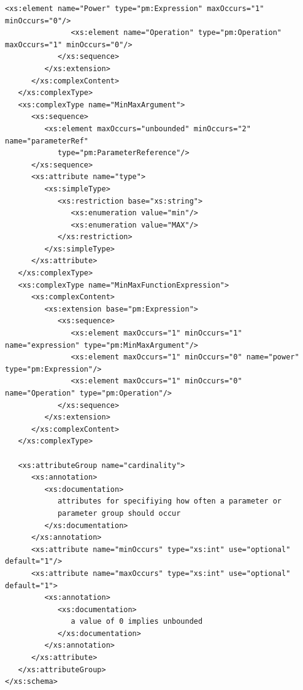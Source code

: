 \documentclass[a4paper,11pt] {ivoa}
\begin{document}
\begin{lstlisting}[style=listXML]
               <xs:element name="Power" type="pm:Expression" maxOccurs="1" minOccurs="0"/>
               <xs:element name="Operation" type="pm:Operation" maxOccurs="1" minOccurs="0"/>
            </xs:sequence>
         </xs:extension>
      </xs:complexContent>
   </xs:complexType>
   <xs:complexType name="MinMaxArgument">
      <xs:sequence>
         <xs:element maxOccurs="unbounded" minOccurs="2" name="parameterRef"
            type="pm:ParameterReference"/>
      </xs:sequence>
      <xs:attribute name="type">
         <xs:simpleType>
            <xs:restriction base="xs:string">
               <xs:enumeration value="min"/>
               <xs:enumeration value="MAX"/>
            </xs:restriction>
         </xs:simpleType>
      </xs:attribute>
   </xs:complexType>
   <xs:complexType name="MinMaxFunctionExpression">
      <xs:complexContent>
         <xs:extension base="pm:Expression">
            <xs:sequence>
               <xs:element maxOccurs="1" minOccurs="1" name="expression" type="pm:MinMaxArgument"/>
               <xs:element maxOccurs="1" minOccurs="0" name="power" type="pm:Expression"/>
               <xs:element maxOccurs="1" minOccurs="0" name="Operation" type="pm:Operation"/>
            </xs:sequence>
         </xs:extension>
      </xs:complexContent>
   </xs:complexType>

   <xs:attributeGroup name="cardinality">
      <xs:annotation>
         <xs:documentation>
            attributes for specifiying how often a parameter or
            parameter group should occur
         </xs:documentation>
      </xs:annotation>
      <xs:attribute name="minOccurs" type="xs:int" use="optional" default="1"/>
      <xs:attribute name="maxOccurs" type="xs:int" use="optional" default="1">
         <xs:annotation>
            <xs:documentation>
               a value of 0 implies unbounded
            </xs:documentation>
         </xs:annotation>
      </xs:attribute>
   </xs:attributeGroup>
</xs:schema>
\end{lstlisting}
\end{document}
